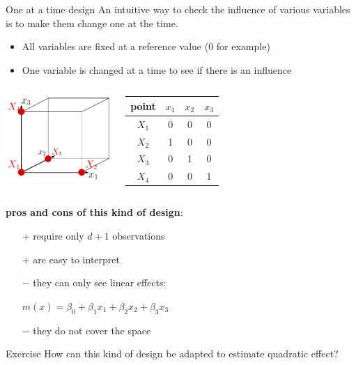 \documentclass{beamer}
\begin{document}
\begin{frame}{One at a time design}
An intuitive way to check the influence of various variables is to make them change one at the time.
\begin{itemize}
	\item All variables are fixed at a reference value (0 for example)
	\item One variable is changed at a time to see if there is an influence
\end{itemize}
\vspace{5mm}
\begin{example}
\begin{columns}[c]
\column{5cm}
\begin{center}
\includegraphics[width=4cm]{figures/latexdraw/1atatime}
\end{center}
\column{5cm}
\begin{center}
  \begin{tabular}{|c|ccc|}
  \hline
  point & $x_1$ & $x_2$ & $x_3$ \\ \hline
  $X_1$ & 0 & 0 & 0 \\
  $X_2$ & 1 & 0 & 0 \\
  $X_3$ & 0 & 1 & 0 \\
  $X_4$ & 0 & 0 & 1 \\ \hline
  \end{tabular}
\end{center}
\end{columns}
\end{example}
\end{frame}

\begin{frame}{}
\textbf{pros and cons of this kind of design}:
\begin{itemize}
  \item[+] require only $d+1$ observations
  \item[+] are easy to interpret
  \item[] \vspace{-4mm}
  \item[$-$] they can only see linear effects: 
  \begin{center}
  $m(x)=\beta_0 + \beta_1 x_1 + \beta_2 x_2 + \beta_3 x_3$
  \end{center}
  \item[$-$] they do not cover the space
\end{itemize}
\vspace{5mm}
\begin{exampleblock}{Exercise}
How can this kind of design be adapted to estimate quadratic effect?
\end{exampleblock}
\end{frame}
\end{document}
